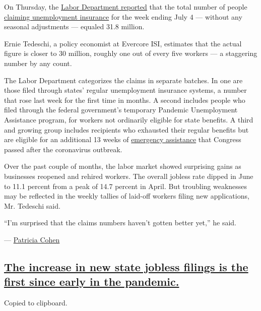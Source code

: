 On Thursday, the
\href{https://oui.doleta.gov/press/2020/072320.pdf}{Labor Department
reported} that the total number of people
\href{https://www.nytimes.com/2020/07/23/business/economy/unemployment-gig-workers-coronavirus.html}{claiming
unemployment insurance} for the week ending July 4 --- without any
seasonal adjustments --- equaled 31.8 million.

Ernie Tedeschi, a policy economist at Evercore ISI, estimates that the
actual figure is closer to 30 million, roughly one out of every five
workers --- a staggering number by any count.

The Labor Department categorizes the claims in separate batches. In one
are those filed through states' regular unemployment insurance systems,
a number that rose last week for the first time in months. A second
includes people who filed through the federal government's temporary
Pandemic Unemployment Assistance program, for workers not ordinarily
eligible for state benefits. A third and growing group includes
recipients who exhausted their regular benefits but are eligible for an
additional 13 weeks of
\href{https://www.nytimes.com/2020/07/21/business/economy/coronavirus-unemployment-benefits.html}{emergency
assistance} that Congress passed after the coronavirus outbreak.

Over the past couple of months, the labor market showed surprising gains
as businesses reopened and rehired workers. The overall jobless rate
dipped in June to 11.1 percent from a peak of 14.7 percent in April. But
troubling weaknesses may be reflected in the weekly tallies of laid-off
workers filing new applications, Mr. Tedeschi said.

``I'm surprised that the claims numbers haven't gotten better yet,'' he
said.

--- \href{https://www.nytimes.com/by/patricia-cohen}{Patricia Cohen}

\hypertarget{the-increase-in-new-state-jobless-filings-is-the-first-since-early-in-the-pandemic}{%
\subsection{\texorpdfstring{\protect\hyperlink{weekly-unemployment-numbers}{The
increase in new state jobless filings is the first since early in the
pandemic.}}{The increase in new state jobless filings is the first since early in the pandemic.}}\label{the-increase-in-new-state-jobless-filings-is-the-first-since-early-in-the-pandemic}}

Copied to clipboard.

